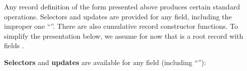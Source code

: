 \begin{isabellebody}
\begin{isamarkuptext}
\begin{description}
  \end{description}%
\end{isamarkuptext}%
\isamarkuptrue%
%
\isamarkuptrue%
%
\begin{isamarkuptext}%
Any record definition of the form presented above produces certain
  standard operations.  Selectors and updates are provided for any
  field, including the improper one ``''.  There are also
  cumulative record constructor functions.  To simplify the
  presentation below, we assume for now that  is a root record with fields .

  \medskip \textbf{Selectors} and \textbf{updates} are available for
  any field (including ``''):


\end{isamarkuptext}
\end{isabellebody}
